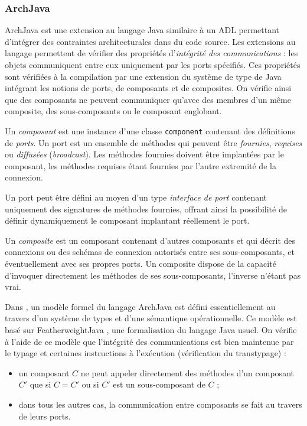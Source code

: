 \subsubsection{ArchJava}

ArchJava\cite{aldrich-archjava,aldrich-archjava-reasoning} est une
extension au langage \textsf{Java} similaire \`a un ADL permettant d'int\'egrer des
contraintes architecturales dans du code source. Les extensions au
langage permettent de v\'erifier des propri\'et\'es
d'\emph{int\'egrit\'e des communications} : les objets communiquent entre
eux uniquement par les ports sp\'ecifi\'es. Ces propri\'et\'es
sont v\'erifi\'ees \`a la compilation par une extension du
syst\`eme de type de Java int\'egrant les notions de ports, de
composants et de composites. On v\'erifie ainsi que des composants ne
peuvent communiquer qu'avec des membres d'un m\^eme composite, des
sous-composants ou le composant englobant. 

Un \emph{composant} est une instance d'une classe \texttt{component}
contenant des d\'efinitions de \emph{ports}. Un port est un ensemble
de m\'ethodes qui peuvent \^etre \emph{fournies}, \emph{requises} ou
\emph{diffus\'ees} (\emph{broadcast}). Les m\'ethodes fournies doivent
\^etre implant\'ees par le composant, les m\'ethodes requises
\'etant fournies par l'autre extremit\'e de la connexion. 

Un port peut \^etre d\'efini au moyen d'un type \emph{interface de
  port} contenant uniquement des signatures de m\'ethodes
  fournies, offrant ainsi la possibilit\'e de d\'efinir
  dynamiquement le composant implantant r\'eellement le port. 

Un \emph{composite} est un composant contenant d'autres composants et qui
d\'ecrit des connexions ou des sch\'emas de connexion autoris\'es
entre ses sous-composants, et \'eventuellement avec ses propres
ports. Un composite dispose de la capacit\'e d'invoquer directement
les m\'ethodes de ses sous-composants, l'inverse n'\'etant pas vrai.

Dans  \cite{aldrich-archjava-reasoning}, un mod\`ele formel du
langage ArchJava est d\'efini essentiellement au travers d'un syst\`eme de types
et d'une s\'emantique op\'erationnelle. Ce mod\`ele est
bas\'e sur FeatherweightJava \cite{featherweightjava}, une
formalisation du langage \textsf{Java} usuel. On
v\'erifie \`a l'aide de ce mod\`ele que l'int\'egrit\'e des communications est bien maintenue
par le typage et certaines instructions \`a l'ex\'ecution
(v\'erification du transtypage) :
\begin{itemize}
  \item un composant $C$ ne peut appeler directement des m\'ethodes
    d'un composant $C'$ que si $C=C'$ ou si $C'$ est un sous-composant
    de $C$ ;
  \item dans tous les autres cas, la communication entre composants se
    fait au travers de leurs ports.
\end{itemize}

